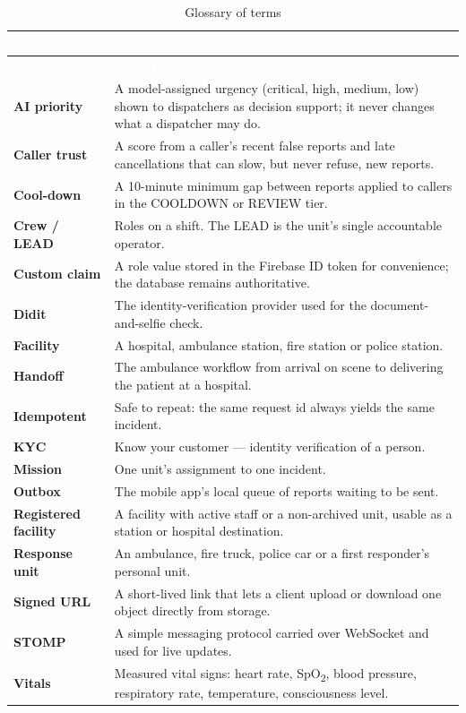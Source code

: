{\tabfont\rowband
\begin{longtable}{@{}>{\raggedright\arraybackslash}p{}>{\raggedright\arraybackslash}p{}@{}}
\caption{Glossary of terms}\label{tab:glossary}\\
\rowcolor{najdanavy}\textcolor{white}{\sffamily\bfseries\small Term} & \textcolor{white}{\sffamily\bfseries\small Definition}\\
\endfirsthead
\rowcolor{najdanavy}\textcolor{white}{\sffamily\bfseries\small Term} & \textcolor{white}{\sffamily\bfseries\small Definition}\\
\endhead
\bottomrule\endlastfoot
\textbf{AI priority} & A model-assigned urgency (critical, high, medium, low) shown to dispatchers as decision support; it never changes what a dispatcher may do.\\
\textbf{Caller trust} & A score from a caller’s recent false reports and late cancellations that can slow, but never refuse, new reports.\\
\textbf{Cool-down} & A 10-minute minimum gap between reports applied to callers in the COOLDOWN or REVIEW tier.\\
\textbf{Crew /\allowbreak{} LEAD} & Roles on a shift. The LEAD is the unit’s single accountable operator.\\
\textbf{Custom claim} & A role value stored in the Firebase ID token for convenience; the database remains authoritative.\\
\textbf{Didit} & The identity-verification provider used for the document-and-selfie check.\\
\textbf{Facility} & A hospital, ambulance station, fire station or police station.\\
\textbf{Handoff} & The ambulance workflow from arrival on scene to delivering the patient at a hospital.\\
\textbf{Idempotent} & Safe to repeat: the same request id always yields the same incident.\\
\textbf{KYC} & Know your customer --- identity verification of a person.\\
\textbf{Mission} & One unit’s assignment to one incident.\\
\textbf{Outbox} & The mobile app’s local queue of reports waiting to be sent.\\
\textbf{Registered facility} & A facility with active staff or a non-archived unit, usable as a station or hospital destination.\\
\textbf{Response unit} & An ambulance, fire truck, police car or a first responder’s personal unit.\\
\textbf{Signed URL} & A short-lived link that lets a client upload or download one object directly from storage.\\
\textbf{STOMP} & A simple messaging protocol carried over WebSocket and used for live updates.\\
\textbf{Vitals} & Measured vital signs: heart rate, SpO\textsubscript{2}, blood pressure, respiratory rate, temperature, consciousness level.\\
\end{longtable}}
